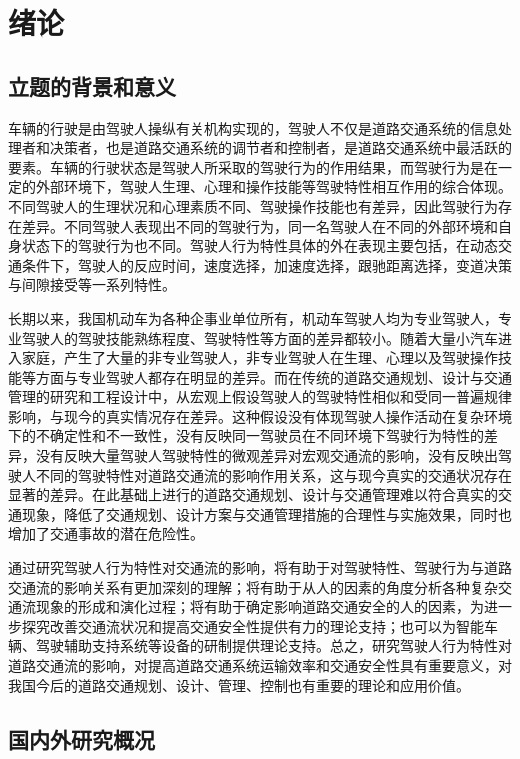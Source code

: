 \chapter{绪论}
\section{立题的背景和意义}

车辆的行驶是由驾驶人操纵有关机构实现的，驾驶人不仅是道路交通系统的信息处理者和决策者，也是道路交通系统的调节者和控制者，是道路交通系统中最活跃的要素。车辆的行驶状态是驾驶人所采取的驾驶行为的作用结果，而驾驶行为是在一定的外部环境下，驾驶人生理、心理和操作技能等驾驶特性相互作用的综合体现。不同驾驶人的生理状况和心理素质不同、驾驶操作技能也有差异，因此驾驶行为存在差异。不同驾驶人表现出不同的驾驶行为，同一名驾驶人在不同的外部环境和自身状态下的驾驶行为也不同。驾驶人行为特性具体的外在表现主要包括，在动态交通条件下，驾驶人的反应时间，速度选择，加速度选择，跟驰距离选择，变道决策与间隙接受等一系列特性。

长期以来，我国机动车为各种企事业单位所有，机动车驾驶人均为专业驾驶人，专业驾驶人的驾驶技能熟练程度、驾驶特性等方面的差异都较小。随着大量小汽车进入家庭，产生了大量的非专业驾驶人，非专业驾驶人在生理、心理以及驾驶操作技能等方面与专业驾驶人都存在明显的差异。而在传统的道路交通规划、设计与交通管理的研究和工程设计中，从宏观上假设驾驶人的驾驶特性相似和受同一普遍规律影响，与现今的真实情况存在差异。这种假设没有体现驾驶人操作活动在复杂环境下的不确定性和不一致性，没有反映同一驾驶员在不同环境下驾驶行为特性的差异，没有反映大量驾驶人驾驶特性的微观差异对宏观交通流的影响，没有反映出驾驶人不同的驾驶特性对道路交通流的影响作用关系，这与现今真实的交通状况存在显著的差异。在此基础上进行的道路交通规划、设计与交通管理难以符合真实的交通现象，降低了交通规划、设计方案与交通管理措施的合理性与实施效果，同时也增加了交通事故的潜在危险性。

通过研究驾驶人行为特性对交通流的影响，将有助于对驾驶特性、驾驶行为与道路交通流的影响关系有更加深刻的理解；将有助于从人的因素的角度分析各种复杂交通流现象的形成和演化过程；将有助于确定影响道路交通安全的人的因素，为进一步探究改善交通流状况和提高交通安全性提供有力的理论支持；也可以为智能车辆、驾驶辅助支持系统等设备的研制提供理论支持。总之，研究驾驶人行为特性对道路交通流的影响，对提高道路交通系统运输效率和交通安全性具有重要意义，对我国今后的道路交通规划、设计、管理、控制也有重要的理论和应用价值。



\section{国内外研究概况}

